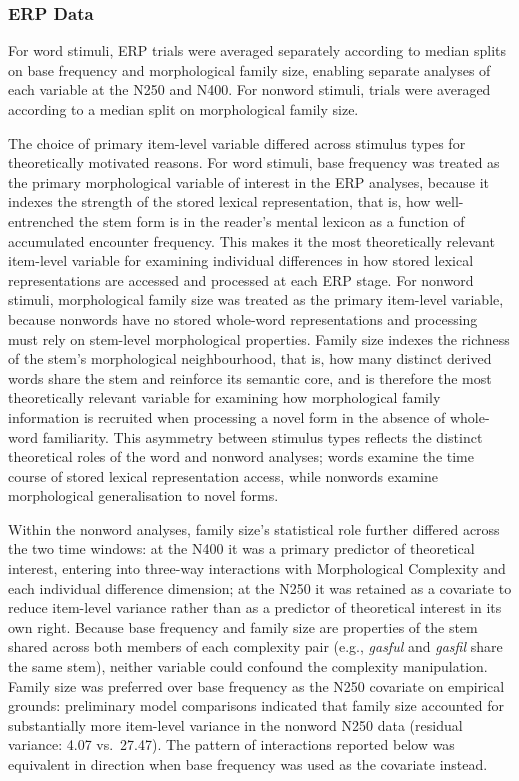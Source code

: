 \documentclass[utf8]{FrontiersinHarvard} %
\begin{document}
	\subsubsection{ERP Data}
	
	For word stimuli, ERP trials were averaged separately according to median splits on base frequency and morphological family size, enabling separate analyses of each variable at the N250 and N400. For nonword stimuli, trials were averaged according to a median split on morphological family size. 
	
	The choice of primary item-level variable differed across stimulus types for theoretically motivated reasons. For word stimuli, base frequency was treated as the primary morphological variable of interest in the ERP analyses, because it indexes the strength of the stored lexical representation, that is, how well-entrenched the stem form is in the reader's mental lexicon as a function of accumulated encounter frequency. This makes it the most theoretically relevant item-level variable for examining individual differences in how stored lexical representations are accessed and processed at each ERP stage. For nonword stimuli, morphological family size was treated as the primary item-level variable, because nonwords have no stored whole-word representations and processing must rely on stem-level morphological properties. Family size indexes the richness of the stem's morphological neighbourhood, that is, how many distinct derived words share the stem and reinforce its semantic core, and is therefore the most theoretically relevant variable for examining how morphological family information is recruited when processing a novel form in the absence of whole-word familiarity. This asymmetry between stimulus types reflects the distinct theoretical roles of the word and nonword analyses; words examine the time course of stored lexical representation access, while nonwords examine morphological generalisation to novel forms.
	
	Within the nonword analyses, family size's statistical role further differed across the two time windows: at the N400 it was a primary predictor of theoretical interest, entering into three-way interactions with Morphological Complexity and each individual difference dimension; at the N250 it was retained as a covariate to reduce item-level variance rather than as a predictor of theoretical interest in its own right. Because base frequency and family size are properties of the stem shared across both members of each complexity pair (e.g., \textit{gasful} and \textit{gasfil} share the same stem), neither variable could confound the complexity manipulation. Family size was preferred over base frequency as the N250 covariate on empirical grounds: preliminary model comparisons indicated that family size accounted for substantially more item-level variance in the nonword N250 data (residual variance: 4.07 vs.\ 27.47). The pattern of interactions reported below was equivalent in direction when base frequency was used as the covariate instead.
	
\end{document}
